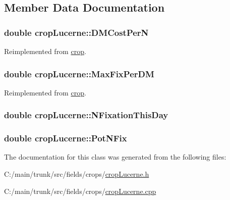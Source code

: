 \subsection{Member Data Documentation}
\hypertarget{classcrop_lucerne_a8b4d1f5dcb870fac95a5f4e1d1030617}{
\subsubsection[{DMCostPerN}]{\setlength{\rightskip}{0pt plus 5cm}double {\bf cropLucerne::DMCostPerN}}}
\label{classcrop_lucerne_a8b4d1f5dcb870fac95a5f4e1d1030617}


Reimplemented from \hyperlink{classcrop_af06dc09d391a57692b440c7c492dbc41}{crop}.\hypertarget{classcrop_lucerne_a1825e7ae2c0a02fa019d85c9df1e994c}{
\subsubsection[{MaxFixPerDM}]{\setlength{\rightskip}{0pt plus 5cm}double {\bf cropLucerne::MaxFixPerDM}}}
\label{classcrop_lucerne_a1825e7ae2c0a02fa019d85c9df1e994c}


Reimplemented from \hyperlink{classcrop_acd7a9182db99895de016c87785b58cc9}{crop}.\hypertarget{classcrop_lucerne_a1ddd2bbb29f98dd4dcd30e7a947ea1ec}{
\subsubsection[{NFixationThisDay}]{\setlength{\rightskip}{0pt plus 5cm}double {\bf cropLucerne::NFixationThisDay}}}
\label{classcrop_lucerne_a1ddd2bbb29f98dd4dcd30e7a947ea1ec}
\hypertarget{classcrop_lucerne_a3e326582f4ff33cd22db66290510696c}{
\subsubsection[{PotNFix}]{\setlength{\rightskip}{0pt plus 5cm}double {\bf cropLucerne::PotNFix}}}
\label{classcrop_lucerne_a3e326582f4ff33cd22db66290510696c}


The documentation for this class was generated from the following files:\begin{DoxyCompactItemize}
\item 
C:/main/trunk/src/fields/crops/\hyperlink{crop_lucerne_8h}{cropLucerne.h}\item 
C:/main/trunk/src/fields/crops/\hyperlink{crop_lucerne_8cpp}{cropLucerne.cpp}\end{DoxyCompactItemize}
